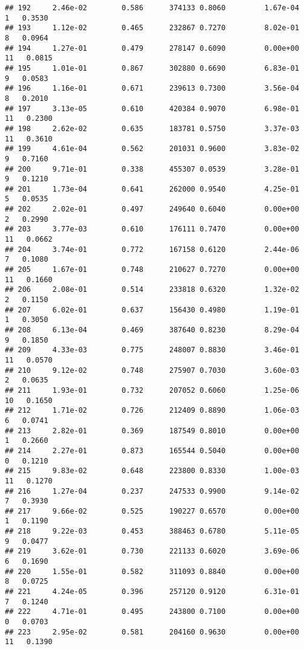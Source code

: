 \documentclass[
]{article}
\begin{document}
\begin{verbatim}
## 192     2.46e-02        0.586      374133 0.8060         1.67e-04   1   0.3530
## 193     1.12e-02        0.465      232867 0.7270         8.02e-01   8   0.0964
## 194     1.27e-01        0.479      278147 0.6090         0.00e+00  11   0.0815
## 195     1.01e-01        0.867      302880 0.6690         6.83e-01   9   0.0583
## 196     1.16e-01        0.671      239613 0.7300         3.56e-04   8   0.2010
## 197     3.13e-05        0.610      420384 0.9070         6.98e-01  11   0.2300
## 198     2.62e-02        0.635      183781 0.5750         3.37e-03  11   0.3610
## 199     4.61e-04        0.562      201031 0.9600         3.83e-02   9   0.7160
## 200     9.71e-01        0.338      455307 0.0539         3.28e-01   9   0.1210
## 201     1.73e-04        0.641      262000 0.9540         4.25e-01   5   0.0535
## 202     2.02e-01        0.497      249640 0.6040         0.00e+00   2   0.2990
## 203     3.77e-03        0.610      176111 0.7470         0.00e+00  11   0.0662
## 204     3.74e-01        0.772      167158 0.6120         2.44e-06   7   0.1080
## 205     1.67e-01        0.748      210627 0.7270         0.00e+00  11   0.1660
## 206     2.08e-01        0.514      233818 0.6320         1.32e-02   2   0.1150
## 207     6.02e-01        0.637      156430 0.4980         1.19e-01   1   0.3050
## 208     6.13e-04        0.469      387640 0.8230         8.29e-04   9   0.1850
## 209     4.33e-03        0.775      248007 0.8830         3.46e-01  11   0.0570
## 210     9.12e-02        0.748      275907 0.7030         3.60e-03   2   0.0635
## 211     1.93e-01        0.732      207052 0.6060         1.25e-06  10   0.1650
## 212     1.71e-02        0.726      212409 0.8890         1.06e-03   6   0.0741
## 213     2.82e-01        0.369      187549 0.8010         0.00e+00   1   0.2660
## 214     2.27e-01        0.873      165544 0.5040         0.00e+00   0   0.1210
## 215     9.83e-02        0.648      223800 0.8330         1.00e-03  11   0.1270
## 216     1.27e-04        0.237      247533 0.9900         9.14e-02   7   0.3930
## 217     9.66e-02        0.525      190227 0.6570         0.00e+00   1   0.1190
## 218     9.22e-03        0.453      388463 0.6780         5.11e-05   9   0.0477
## 219     3.62e-01        0.730      221133 0.6020         3.69e-06   6   0.1690
## 220     1.55e-01        0.582      311093 0.8840         0.00e+00   8   0.0725
## 221     4.24e-05        0.396      257120 0.9120         6.31e-01   7   0.1240
## 222     4.71e-01        0.495      243800 0.7100         0.00e+00   0   0.0703
## 223     2.95e-02        0.581      204160 0.9630         0.00e+00  11   0.1390

\end{verbatim}
\end{document}

